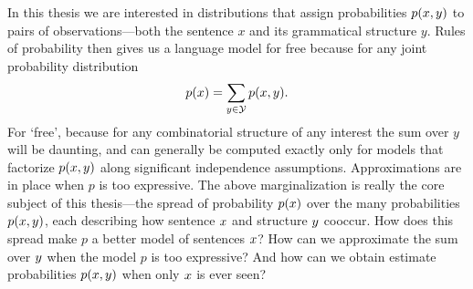   In this thesis we are interested in distributions that assign probabilities $p(x, y)$ to pairs of observations---both the sentence $x$ and its grammatical structure $y$. Rules of probability then gives us a language model for free because for any joint probability distribution
  \begin{align*}
    p(x) = \sum_{y \in \mathcal{Y}} p(x, y).
  \end{align*}
  For `free', because for any combinatorial structure of any interest the sum over $y$ will be daunting, and can generally be computed exactly only for models that factorize $p(x, y)$ along significant independence assumptions. Approximations are  in place when $p$ is too expressive. The above marginalization is really the core subject of this thesis---the spread of probability $p(x)$ over the many probabilities $p(x, y)$, each describing how sentence $x$ and structure $y$ cooccur. How does this spread make $p$ a better model of sentences $x$? How can we approximate the sum over $y$ when the model $p$ is too expressive? And how can we obtain estimate probabilities $p(x, y)$ when only $x$ is ever seen?




